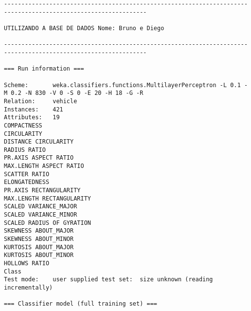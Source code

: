 \documentclass[
	article,			%
	11pt,				%
	oneside,			%
	a4paper,			%
	english,			%
	brazil,				%
	sumario=tradicional
	]{abntex2}
\begin{document}
\begin{lstlisting}
---------------------------------------------------------------------------------------------------------------

UTILIZANDO A BASE DE DADOS Nome: Bruno e Diego

---------------------------------------------------------------------------------------------------------------

=== Run information ===

Scheme:       weka.classifiers.functions.MultilayerPerceptron -L 0.1 -M 0.2 -N 830 -V 0 -S 0 -E 20 -H 18 -G -R
Relation:     vehicle
Instances:    421
Attributes:   19
COMPACTNESS
CIRCULARITY
DISTANCE CIRCULARITY
RADIUS RATIO
PR.AXIS ASPECT RATIO
MAX.LENGTH ASPECT RATIO
SCATTER RATIO
ELONGATEDNESS
PR.AXIS RECTANGULARITY
MAX.LENGTH RECTANGULARITY
SCALED VARIANCE_MAJOR
SCALED VARIANCE_MINOR
SCALED RADIUS OF GYRATION
SKEWNESS ABOUT_MAJOR
SKEWNESS ABOUT_MINOR
KURTOSIS ABOUT_MAJOR
KURTOSIS ABOUT_MINOR
HOLLOWS RATIO
Class
Test mode:    user supplied test set:  size unknown (reading incrementally)

=== Classifier model (full training set) ===


\end{lstlisting}
\end{document}
